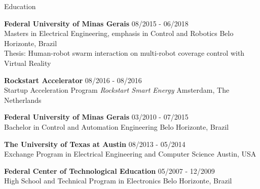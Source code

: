 \documentclass[14pt, a4paper]{resume} %
\begin{document}



\begin{rSection}{Education}

{\bf Federal University of Minas Gerais}  \hfill{08/2015 - 06/2018} \\ 
Masters in Electrical Engineering, emphasis in Control and Robotics \hfill{Belo Horizonte, Brazil} \\
Thesis: Human-robot swarm interaction on multi-robot coverage control with Virtual Reality 

{\bf Rockstart Accelerator}  \hfill{08/2016 - 08/2016} \\ 
Startup Acceleration Program \textit{Rockstart Smart Energy} \hfill{Amsterdam, The Netherlands}

{\bf Federal University of Minas Gerais}  \hfill{03/2010 - 07/2015} \\ 
Bachelor in Control and Automation Engineering \hfill{Belo Horizonte, Brazil}

{\bf The University of Texas at Austin} \hfill {08/2013 - 05/2014} \\ 
Exchange Program in Electrical Engineering and Computer Science \hfill {Austin, USA}

{\bf Federal Center of Technological Education} \hfill {05/2007 - 12/2009} \\ 
High School and Technical Program in Electronics \hfill{Belo Horizonte, Brazil}

\end{rSection}

\end{document}
